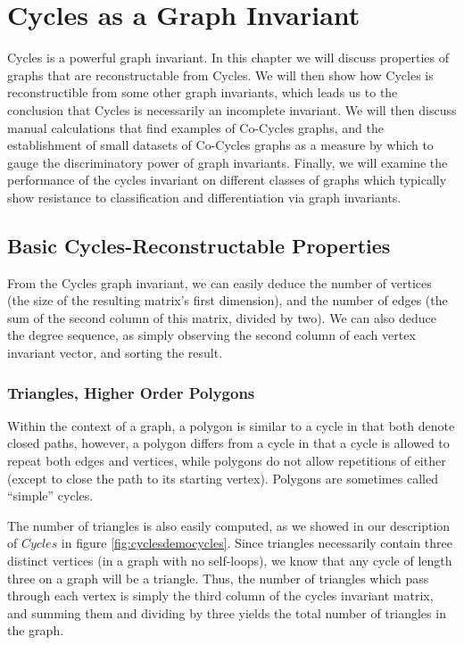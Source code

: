 \chapter{Cycles as a Graph Invariant}
Cycles is a powerful graph invariant.
In this chapter we will discuss properties of graphs that are reconstructable from Cycles.
We will then show how Cycles is reconstructible from some other graph invariants, which leads us to the conclusion that Cycles is necessarily an incomplete invariant.
We will then discuss manual calculations that find examples of Co-Cycles graphs, and the establishment of small datasets of Co-Cycles graphs as a measure by which to gauge the discriminatory power of graph invariants.
Finally, we will examine the performance of the cycles invariant on different classes of graphs which typically show resistance to classification and differentiation via graph invariants.

\section{Basic Cycles-Reconstructable Properties}

From the Cycles graph invariant, we can easily deduce the number of vertices (the size of the resulting matrix's first dimension), and the number of edges (the sum of the second column of this matrix, divided by two).
We can also deduce the degree sequence, as simply observing the second column of each vertex invariant vector, and sorting the result.

\subsection{Triangles, Higher Order Polygons}
Within the context of a graph, a polygon is similar to a cycle in that both denote closed paths, however, a polygon differs from a cycle in that a cycle is allowed to repeat both edges and vertices, while polygons do not allow repetitions of either (except to close the path to its starting vertex).
Polygons are sometimes called ``simple'' cycles.

The number of triangles is also easily computed, as we showed in our description of $Cycles$ in figure \ref{fig:cyclesdemocycles}.  Since triangles necessarily contain three distinct vertices (in a graph with no self-loops), we know that any cycle of length three on a graph will be a triangle.
Thus, the number of triangles which pass through each vertex is simply the third column of the cycles invariant matrix, and summing them and dividing by three yields the total number of triangles in the graph.

